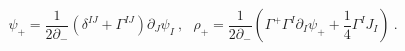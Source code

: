 \begin{equation}
\psi_+ = \frac{1}{2 \partial_-}
   ( \delta^{IJ} + \Gamma^{IJ} ) \partial_J \psi_I ~,~~~
\rho_+ = \frac{1}{2 \partial_-}
  ( \Gamma^+ \Gamma^I \partial_I \psi_+
   + \frac{1}{4} \Gamma^I J_I ) ~.
\end{equation}

